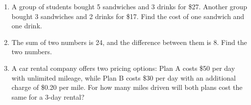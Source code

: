 \begin{enumerate}[noitemsep, label = \color{blue}\arabic*. ]
    \item A group of students bought 5 sandwiches and 3 drinks for \$27. Another group bought 3 sandwiches and 2 drinks for \$17. Find the cost of one sandwich and one drink.
    
    \item The sum of two numbers is 24, and the difference between them is 8. Find the two numbers.
    
    \item A car rental company offers two pricing options: Plan A costs \$50 per day with unlimited mileage, while Plan B costs \$30 per day with an additional charge of \$0.20 per mile. For how many miles driven will both plans cost the same for a 3-day rental?
\end{enumerate}

